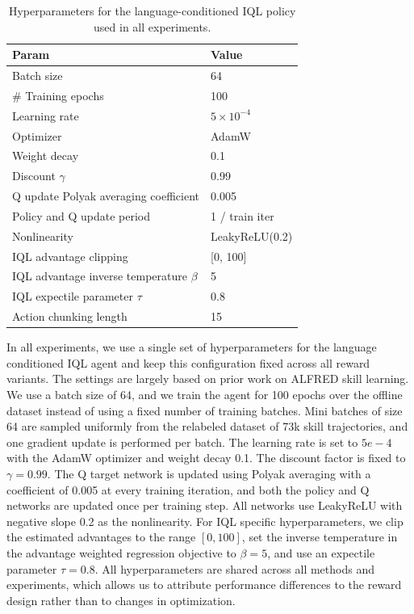 \documentclass[master,english,final]{kaist-ucs}
\begin{document}
\begin{table}[t]
\centering
\begin{tabular}{ll}
\toprule
Param & Value \\
\midrule
Batch size & 64 \\
\# Training epochs & 100 \\
Learning rate & $5 \times 10^{-4}$ \\
Optimizer & AdamW \\
Weight decay & 0.1 \\
Discount $\gamma$ & 0.99 \\
Q update Polyak averaging coefficient & 0.005 \\
Policy and Q update period & 1 / train iter \\
Nonlinearity & LeakyReLU(0.2) \\
IQL advantage clipping & [0, 100] \\
IQL advantage inverse temperature $\beta$ & 5 \\
IQL expectile parameter $\tau$ & 0.8 \\
Action chunking length & 15 \\
\bottomrule
\end{tabular}
\caption{Hyperparameters for the language-conditioned IQL policy used in all experiments.}
\label{tab:iql_hyperparams}
\end{table}

In all experiments, we use a single set of hyperparameters for the language conditioned IQL agent and keep this configuration fixed across all reward variants. The settings are largely based on prior work on ALFRED skill learning. We use a batch size of 64, and we train the agent for 100 epochs over the offline dataset instead of using a fixed number of training batches. Mini batches of size 64 are sampled uniformly from the relabeled dataset of 73k skill trajectories, and one gradient update is performed per batch. The learning rate is set to $5e-4$ with the AdamW optimizer and weight decay 0.1. The discount factor is fixed to $\gamma=0.99$. The Q target network is updated using Polyak averaging with a coefficient of 0.005 at every training iteration, and both the policy and Q networks are updated once per training step. All networks use LeakyReLU with negative slope 0.2 as the nonlinearity. For IQL specific hyperparameters, we clip the estimated advantages to the range $[0,100]$, set the inverse temperature in the advantage weighted regression objective to $\beta=5$, and use an expectile parameter $\tau=0.8$. All hyperparameters are shared across all methods and experiments, which allows us to attribute performance differences to the reward design rather than to changes in optimization.
\end{document}

